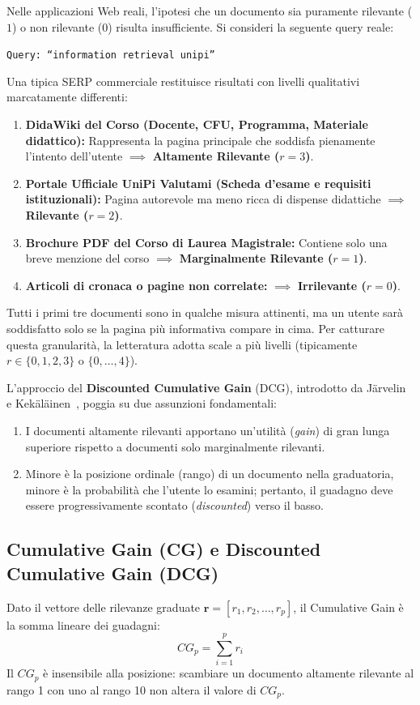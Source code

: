 Nelle applicazioni Web reali, l'ipotesi che un documento sia puramente rilevante ($1$) o non rilevante ($0$) risulta insufficiente. Si consideri la seguente query reale:
\begin{center}
\texttt{Query: ``information retrieval unipi''}
\end{center}
Una tipica SERP commerciale restituisce risultati con livelli qualitativi marcatamente differenti:
\begin{enumerate}
    \item \textbf{DidaWiki del Corso (Docente, CFU, Programma, Materiale didattico):} Rappresenta la pagina principale che soddisfa pienamente l'intento dell'utente $\implies$ \textbf{Altamente Rilevante ($r = 3$)}.
    \item \textbf{Portale Ufficiale UniPi Valutami (Scheda d'esame e requisiti istituzionali):} Pagina autorevole ma meno ricca di dispense didattiche $\implies$ \textbf{Rilevante ($r = 2$)}.
    \item \textbf{Brochure PDF del Corso di Laurea Magistrale:} Contiene solo una breve menzione del corso $\implies$ \textbf{Marginalmente Rilevante ($r = 1$)}.
    \item \textbf{Articoli di cronaca o pagine non correlate:} $\implies$ \textbf{Irrilevante ($r = 0$)}.
\end{enumerate}
Tutti i primi tre documenti sono in qualche misura attinenti, ma un utente sarà soddisfatto solo se la pagina più informativa compare in cima. Per catturare questa granularità, la letteratura adotta scale a più livelli (tipicamente $r \in \{0, 1, 2, 3\}$ o $\{0, \dots, 4\}$).

L'approccio del \textbf{Discounted Cumulative Gain} (DCG), introdotto da J\"arvelin e Kek\"al\"ainen~\cite{jarvelin2002}, poggia su due assunzioni fondamentali:
\begin{enumerate}
    \item I documenti altamente rilevanti apportano un'utilità (\textit{gain}) di gran lunga superiore rispetto a documenti solo marginalmente rilevanti.
    \item Minore è la posizione ordinale (rango) di un documento nella graduatoria, minore è la probabilità che l'utente lo esamini; pertanto, il guadagno deve essere progressivamente scontato (\textit{discounted}) verso il basso.
\end{enumerate}

\subsection{Cumulative Gain (CG) e Discounted Cumulative Gain (DCG)}
\begin{definition}
Dato il vettore delle rilevanze graduate $\mathbf{r} = [r_1, r_2, \dots, r_p]$, il Cumulative Gain è la somma lineare dei guadagni:
\begin{equation}
CG_p = \sum_{i=1}^p r_i
\end{equation}
Il $CG_p$ è insensibile alla posizione: scambiare un documento altamente rilevante al rango 1 con uno al rango 10 non altera il valore di $CG_p$.
\end{definition}

